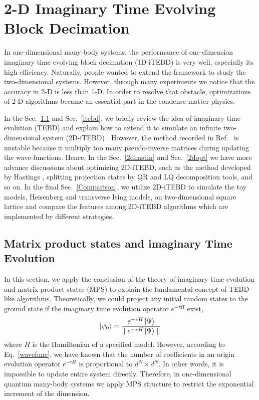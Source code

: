 \chapter{2-D Imaginary Time Evolving Block Decimation}
\label{chapter:2ditebd}

In one-dimensional many-body systems, the performance of one-dimension imaginary time evolving block decimation (1D-iTEBD) is very well, especially its high efficiency. Naturally, people wanted to extend the framework to study the two-dimensional systems. However, through many experiments we notice that the accuracy in 2-D is less than 1-D. In order to resolve that obstacle, optimizations of 2-D algorithms became an essential part in the condense matter physics. 

In the Sec.~\ref{ite} and Sec.~\ref{itebd}, we briefly review the idea of imaginary time evolution (TEBD) \cite{PhysRevLett.93.040502} \cite{PhysRevB.78.155117} and explain how to extend it to simulate an infinite two-dimensional system (2D-iTEBD) \cite{PhysRevB.86.195137}. However, the method recorded in Ref.~\cite{PhysRevB.86.195137} is unstable because it multiply too many pseudo-inverse matrices during updating the wave-functions. Hence, In the Sec.~\ref{2dhastin} and Sec.~\ref{2dopt} we have more advance discussions about optimizing 2D-iTEBD, such as the method developed by Hastings \cite{light_hastings}, splitting projection states by QR and LQ decomposition tools, and so on. In the final Sec.~\ref{Comparison}, we utilize 2D-iTEBD to simulate the toy models, Heisenberg and transverse Ising models, on two-dimensional square lattice and compare the features among 2D-iTEBD algorithms which are implemented by different strategies.

\section{Matrix product states and imaginary Time Evolution}
\label{ite}
In this section, we apply the conclusion of the theory of imaginary time evolution and matrix product states (MPS) \cite{PhysRevB.73.094423} \cite{PhysRevLett.75.3537} to explain the fundamental concept of TEBD-like algorithms. Theoretically, we could project any initial random states to the ground state if the imaginary time evolution operator $e^{-\tau H}$ exist,  
\begin{align}
	\label{mapgroud}
	\Ket{\psi_0} = \frac{e^{-\tau H} \Ket{\Psi}}{\parallel e^{-\tau H} \Ket{\Psi}\parallel}
\end{align}
where $H$ is the Hamiltonian of a specified model. However, according to Eq.~\ref{wavefunc}, we have known that the number of coefficients in an origin evolution operator $e^{-\tau H}$ is proportional to $d^N \times d^N$. In other words, it is impossible to update entire system directly. Therefore, in one-dimensional quantum many-body systems we apply MPS structure to restrict the exponential increment of the dimension. 

